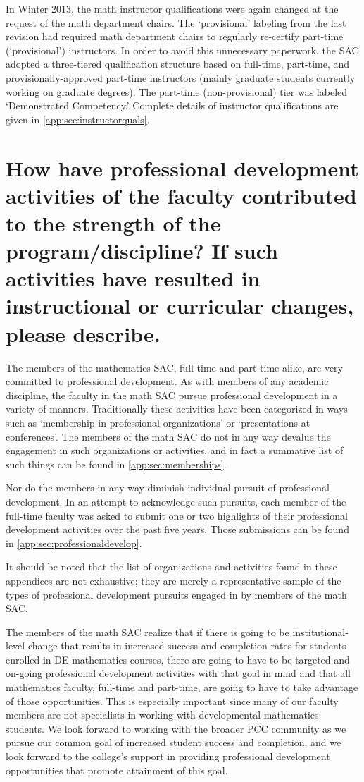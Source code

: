 In Winter 2013, the math instructor qualifications were again changed at the 
request of the math department chairs.  The `provisional' labeling
from the last revision had required math department chairs to regularly
re-certify part-time (`provisional') instructors.  In order to avoid this
unnecessary paperwork, the SAC adopted a three-tiered qualification structure
based on full-time, part-time, and provisionally-approved part-time instructors
(mainly graduate students currently working on graduate degrees).  The
part-time (non-provisional) tier was labeled `Demonstrated Competency.'
Complete details of instructor qualifications are given in \vref{app:sec:instructorquals}.


\section[Professional development activities]{How have professional development activities of the faculty contributed to the strength of the program/discipline? If such activities have resulted in instructional or curricular changes, please describe.}

The members of the mathematics SAC, full-time and part-time alike, are very
committed to professional development.  As with members of any academic
discipline, the faculty in the math SAC pursue professional development in a
variety of manners.  Traditionally these activities have been categorized in
ways such as `membership in professional organizations' or `presentations at
conferences'.  The members of the math SAC do not in any way devalue the
engagement in such organizations or activities, and in fact a summative list of
such things can be found in \vref{app:sec:memberships}.

Nor do the members in any way diminish individual pursuit of professional
development.  In an attempt to acknowledge such pursuits, each member of the
full-time faculty was asked to submit one or two highlights of their
professional development activities over the past five years.  Those
submissions can be found in \vref{app:sec:professionaldevelop}.

It should be noted that the list of organizations and activities found in these
appendices are not exhaustive; they are merely a representative sample of
the types of professional development pursuits engaged in by members of the
math SAC.

The members of the math SAC realize that if there is going to be
institutional-level change that results in increased success and completion
rates for students enrolled in DE mathematics courses, there are going to have
to be targeted and on-going professional development activities with that goal
in mind and that all mathematics faculty, full-time and part-time, are going to
have to take advantage of those opportunities.  This is especially important
since many of our faculty members are not specialists in working with
developmental mathematics students. We look forward to working with the broader
PCC community as we pursue our common goal of increased student success and
completion, and we look forward to the college's support in providing
professional development opportunities that promote attainment of this goal.

